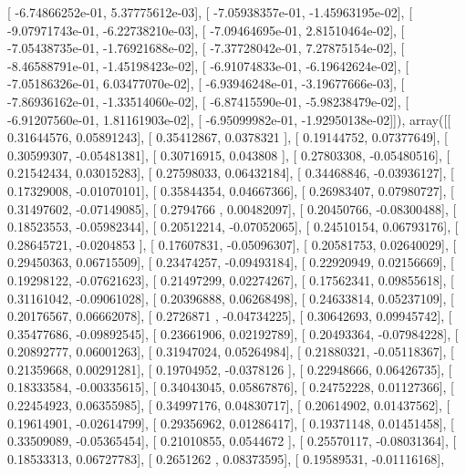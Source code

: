 \documentclass{article}
\begin{document}
       [ -6.74866252e-01,   5.37775612e-03],
       [ -7.05938357e-01,  -1.45963195e-02],
       [ -9.07971743e-01,  -6.22738210e-03],
       [ -7.09464695e-01,   2.81510464e-02],
       [ -7.05438735e-01,  -1.76921688e-02],
       [ -7.37728042e-01,   7.27875154e-02],
       [ -8.46588791e-01,  -1.45198423e-02],
       [ -6.91074833e-01,  -6.19642624e-02],
       [ -7.05186326e-01,   6.03477070e-02],
       [ -6.93946248e-01,  -3.19677666e-03],
       [ -7.86936162e-01,  -1.33514060e-02],
       [ -6.87415590e-01,  -5.98238479e-02],
       [ -6.91207560e-01,   1.81161903e-02],
       [ -6.95099982e-01,  -1.92950138e-02]]), array([[ 0.31644576,  0.05891243],
       [ 0.35412867,  0.0378321 ],
       [ 0.19144752,  0.07377649],
       [ 0.30599307, -0.05481381],
       [ 0.30716915,  0.043808  ],
       [ 0.27803308, -0.05480516],
       [ 0.21542434,  0.03015283],
       [ 0.27598033,  0.06432184],
       [ 0.34468846, -0.03936127],
       [ 0.17329008, -0.01070101],
       [ 0.35844354,  0.04667366],
       [ 0.26983407,  0.07980727],
       [ 0.31497602, -0.07149085],
       [ 0.2794766 ,  0.00482097],
       [ 0.20450766, -0.08300488],
       [ 0.18523553, -0.05982344],
       [ 0.20512214, -0.07052065],
       [ 0.24510154,  0.06793176],
       [ 0.28645721, -0.0204853 ],
       [ 0.17607831, -0.05096307],
       [ 0.20581753,  0.02640029],
       [ 0.29450363,  0.06715509],
       [ 0.23474257, -0.09493184],
       [ 0.22920949,  0.02156669],
       [ 0.19298122, -0.07621623],
       [ 0.21497299,  0.02274267],
       [ 0.17562341,  0.09855618],
       [ 0.31161042, -0.09061028],
       [ 0.20396888,  0.06268498],
       [ 0.24633814,  0.05237109],
       [ 0.20176567,  0.06662078],
       [ 0.2726871 , -0.04734225],
       [ 0.30642693,  0.09945742],
       [ 0.35477686, -0.09892545],
       [ 0.23661906,  0.02192789],
       [ 0.20493364, -0.07984228],
       [ 0.20892777,  0.06001263],
       [ 0.31947024,  0.05264984],
       [ 0.21880321, -0.05118367],
       [ 0.21359668,  0.00291281],
       [ 0.19704952, -0.0378126 ],
       [ 0.22948666,  0.06426735],
       [ 0.18333584, -0.00335615],
       [ 0.34043045,  0.05867876],
       [ 0.24752228,  0.01127366],
       [ 0.22454923,  0.06355985],
       [ 0.34997176,  0.04830717],
       [ 0.20614902,  0.01437562],
       [ 0.19614901, -0.02614799],
       [ 0.29356962,  0.01286417],
       [ 0.19371148,  0.01451458],
       [ 0.33509089, -0.05365454],
       [ 0.21010855,  0.0544672 ],
       [ 0.25570117, -0.08031364],
       [ 0.18533313,  0.06727783],
       [ 0.2651262 ,  0.08373595],
       [ 0.19589531, -0.01116168],
\end{document}
